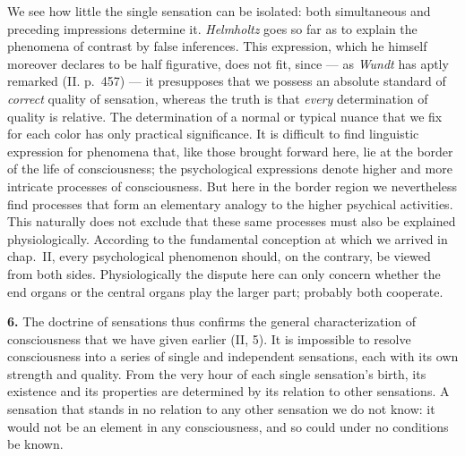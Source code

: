 \documentclass[12pt,a4paper]{book}
\begin{document}
We see how little the single sensation can be isolated: both
simultaneous and preceding impressions determine it. \emph{Helmholtz}
goes so far as to explain the phenomena of contrast by false inferences.
This expression, which he himself moreover declares to be half
figurative, does not fit, since --- as \emph{Wundt} has aptly remarked
(II. p.~457) --- it presupposes that we possess an absolute standard of
\emph{correct} quality of sensation, whereas the truth is that
\emph{every} determination of quality is relative. The determination of
a normal or typical nuance that we fix for each color has only practical
significance. It is difficult to find linguistic expression for
phenomena that, like those brought forward here, lie at the border of
the life of consciousness; the psychological expressions denote higher
and more intricate processes of consciousness. But here in the border
region we nevertheless find processes that form an elementary analogy
to the higher psychical activities. This naturally does not exclude
that these same processes must also be explained physiologically.
According to the fundamental conception at which we arrived in chap.\
II, every psychological phenomenon should, on the contrary, be viewed
from both sides. Physiologically the dispute here can only concern
whether the end organs or the central organs play the larger part;
probably both cooperate.

\textbf{6.} The doctrine of sensations thus confirms the general
characterization of consciousness that we have given earlier (II, 5).
It is impossible to resolve consciousness into a series of single and
independent sensations, each with its own strength and quality. From
the very hour of each single sensation's birth, its existence and its
properties are determined by its relation to other sensations. A
sensation that stands in no relation to any other sensation we do not
know: it would not be an element in any consciousness, and so could
under no conditions be known.
\end{document}
